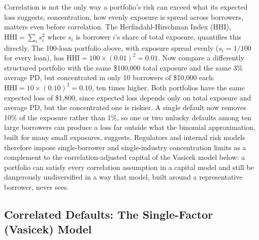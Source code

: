 \documentclass[../ai_in_finance]{subfiles}
\begin{document}
Correlation is not the only way a portfolio's risk can exceed what its expected loss suggests; concentration, how evenly exposure is spread across borrowers, matters even before correlation. The Herfindahl-Hirschman Index (HHI), $\text{HHI} = \sum_i s_i^2$ where $s_i$ is borrower $i$'s share of total exposure, quantifies this directly. The 100-loan portfolio above, with exposure spread evenly ($s_i = 1/100$ for every loan), has $\text{HHI} = 100 \times (0.01)^2 = 0.01$. Now compare a differently structured portfolio with the same \$100,000 total exposure and the same 3\% average PD, but concentrated in only 10 borrowers of \$10,000 each: $\text{HHI} = 10 \times (0.10)^2 = 0.10$, ten times higher.
Both portfolios have the same expected loss of \$1,800, since expected loss depends only on total exposure and average PD, but the concentrated one is riskier. A single default now removes 10\% of the exposure rather than 1\%, so one or two unlucky defaults among ten large borrowers can produce a loss far outside what the binomial approximation, built for many small exposures, suggests.
Regulators and internal risk models therefore impose single-borrower and single-industry concentration limits as a complement to the correlation-adjusted capital of the Vasicek model below: a portfolio can satisfy every correlation assumption in a capital model and still be dangerously undiversified in a way that model, built around a representative borrower, never sees.

\subsection{Correlated Defaults: The Single-Factor (Vasicek) Model}
\label{sec:vasicek}
\end{document}
